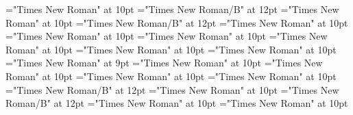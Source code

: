 \documentclass[gps1,twoside]{article}
\begin{document}
\font{}="Times New Roman" at 10pt
\font\spanbzhheadwordreferencedentryreferencedentriesvisiblevariantentryrefvisiblevariantentryrefsminorentrycomplex="Times New Roman/B" at 12pt
\font\headwordreferencedentryreferencedentriesvisiblevariantentryrefvisiblevariantentryrefsminorentrycomplexbefore="Times New Roman" at 10pt
\font\spanheadwordreferencedentryreferencedentriesvisiblevariantentryrefvisiblevariantentryrefsminorentrycomplex="Times New Roman/B" at 12pt
\font{}="Times New Roman" at 10pt
\font\spandefinitionorglossreferencedentryreferencedentriesvisiblevariantentryrefvisiblevariantentryrefsminorentrycomplexfirstchildbefore="Times New Roman" at 10pt
\font\summaryvisiblevariantentryrefvisiblevariantentryrefsminorentrycomplexbefore="Times New Roman" at 10pt
\font\spansummaryvisiblevariantentryrefvisiblevariantentryrefsminorentrycomplexfirstchildbefore="Times New Roman" at 10pt
\font\complexformentryrefsminorentrycomplexbefore="Times New Roman" at 10pt
\font\complexformentryrefsminorentrycomplexafter="Times New Roman" at 10pt
\font\complexformtypecomplexformtypecomplexformtypescomplexformentryrefcomplexformentryrefsminorentrycomplexbefore="Times New Roman" at 9pt
\font\complexformtypescomplexformentryrefcomplexformentryrefsminorentrycomplexafter="Times New Roman" at 10pt
\font\abbreviationcomplexformtypecomplexformtypescomplexformentryrefcomplexformentryrefsminorentrycomplexbefore="Times New Roman" at 10pt
\font\spanabbreviationcomplexformtypecomplexformtypescomplexformentryrefcomplexformentryrefsminorentrycomplexlastchildafter="Times New Roman" at 10pt
\font{}="Times New Roman" at 10pt
\font\spanbzhheadwordreferencedentryreferencedentriescomplexformentryrefcomplexformentryrefsminorentrycomplex="Times New Roman/B" at 12pt
\font\headwordreferencedentryreferencedentriescomplexformentryrefcomplexformentryrefsminorentrycomplexbefore="Times New Roman" at 10pt
\font\spanheadwordreferencedentryreferencedentriescomplexformentryrefcomplexformentryrefsminorentrycomplex="Times New Roman/B" at 12pt
\font{}="Times New Roman" at 10pt
\font\spandefinitionorglossreferencedentryreferencedentriescomplexformentryrefcomplexformentryrefsminorentrycomplexfirstchildbefore="Times New Roman" at 10pt
\end{document}
